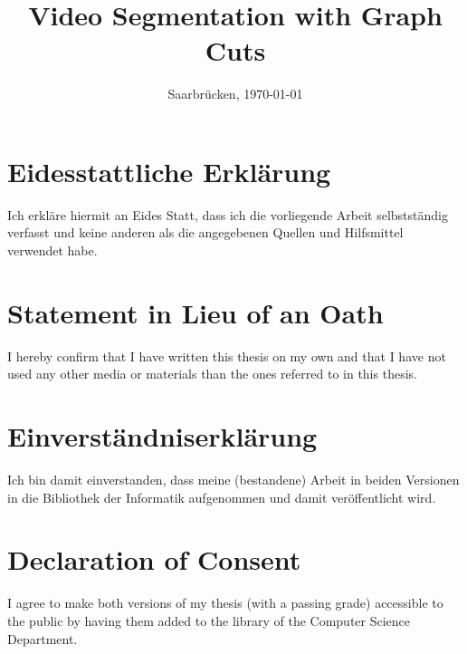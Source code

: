 \documentclass[8pt, a4paper, twoside]{Thesis}
\begin{document}
\frontmatter

\title  {Video Segmentation with Graph Cuts}

\addresses  {\groupname\\\deptname\\\univname}  %
\date       {Saarbr\"ucken, \today }
\subject    {}
\keywords   {}

\maketitle



\thispagestyle{empty}

\section*{Eidesstattliche Erkl\"{a}rung}
Ich erkl\"{a}re hiermit an Eides Statt, dass ich die vorliegende Arbeit selbstst\"{a}ndig verfasst und keine
anderen als die angegebenen Quellen und Hilfsmittel verwendet habe.

\vspace{0.60cm}
\section*{Statement in Lieu of an Oath}
I hereby confirm that I have written this thesis on my own and that I have not used any other media or
materials than the ones referred to in this thesis.
\vspace{1.5cm}

\section*{Einverst\"{a}ndniserkl\"{a}rung}
Ich bin damit einverstanden, dass meine (bestandene) Arbeit in beiden Versionen in die Bibliothek der
Informatik aufgenommen und damit ver\"{o}ffentlicht wird.

\vspace{0.60cm}
\section*{Declaration of Consent}
I agree to make both versions of my thesis (with a passing grade) accessible to the public by having
them added to the library of the Computer Science Department.
\vspace{3cm}
\end{document}
